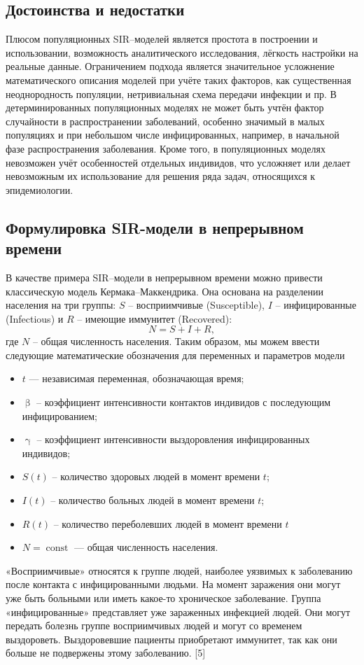 \documentclass[a4paper, 14pt]{extreport}
\numberwithin{equation}{section}
\renewcommand{\beta}{\upbeta}
\renewcommand{\gamma}{\upgamma}
\begin{document}
	\subsection{Достоинства и недостатки}
	Плюсом популяционных SIR–моделей
	является простота в построении и использовании, возможность аналитического
	исследования, лёгкость настройки на реальные данные. Ограничением подхода
	является значительное усложнение математического описания моделей при
	учёте таких факторов, как существенная неоднородность популяции,
	нетривиальная схема передачи инфекции и пр. В детерминированных
	популяционных моделях не может быть учтён фактор случайности в
	распространении заболеваний, особенно значимый в малых популяциях и при
	небольшом числе инфицированных, например, в начальной фазе
	распространения заболевания. Кроме того, в популяционных моделях
	невозможен учёт особенностей отдельных индивидов, что усложняет или
	делает невозможным их использование для решения ряда задач, относящихся к
	эпидемиологии. 
	\subsection{Формулировка SIR-модели в непрерывном времени}
	В качестве примера SIR–модели в непрерывном времени можно привести
	классическую модель Кермака–Маккендрика. Она  основана на разделении населения на три группы: $S$ -- восприимчивые (Susceptible), $I$ -- инфицированные (Infectious) и $R$ -- имеющие иммунитет (Recovered): $$N = S + I + R,$$ где $N$ -- общая численность населения.
	Таким образом, мы можем ввести следующие математические обозначения для переменных и параметров модели
	\begin{itemize}
		\item $t$ --- независимая переменная, обозначающая время;
		\item $\beta$ -- коэффициент интенсивности контактов индивидов с
		последующим инфицированием;
		\item $\gamma$ -- коэффициент интенсивности выздоровления
		инфицированных индивидов;
		\item $S(t)$ -- количество здоровых людей в момент времени $t$; 
		\item $I(t)$ -- количество больных людей в момент времени $t$;
		\item $R(t)$ -- количество переболевших людей в момент времени $t$
		\item $N = \operatorname{const}$ --- общая численность населения.
	\end{itemize}
	«Восприимчивые» относятся к группе людей, наиболее уязвимых к заболеванию после контакта с инфицированными людьми. На момент заражения они могут уже быть больными или иметь какое-то хроническое заболевание. Группа «инфицированные» представляет уже зараженных инфекцией людей. Они могут передать болезнь группе восприимчивых людей и могут со временем выздороветь. Выздоровевшие пациенты приобретают иммунитет, так как они больше не подвержены этому заболеванию. [5]
	
\end{document}
